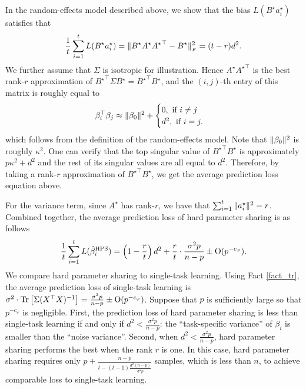 \begin{example}\label{ex_same_cov}
In the random-effects model described above, we show that the bias $L(B^{\star} a_i^{\star})$ satisfies that
\[ \frac{1}{t} \sum_{i=1}^t L(B^{\star} a_i^{\star}) = \|B^{\star} A^{\star} {A^{\star}}^{\top} - B^{\star}\|_{_{F}}^2 = (t - r) d^2. \]
We further assume that $\Sigma$ is isotropic for illustration.
Hence $A^{\star} {A^{\star}}^{\top}$ is the best rank-$r$ approximation of ${B^{\star}}^{\top}\Sigma B^{\star} = {B^{\star}}^{\top} B^{\star}$, and the $(i, j)$-th entry of this matrix is roughly equal to
\begin{align*}
	\beta_i^{\top} \beta_j \approx \|\beta_0\|^2 + \begin{cases}
																								0, \text{ if } i \neq j \\
																								d^2, \text{ if } i = j.
	\end{cases}
\end{align*}
which follows from the definition of the random-effects model.
Note that $\|\beta_0\|^2$ is roughly $\kappa^2$.
One can verify that the top singular value of ${B^{\star}}^{\top} B^{\star}$ is approximately $p \kappa^2 + d^2$ and the rest of its singular values are all equal to $d^2$.
Therefore, by taking a rank-$r$ approximation of ${B^{\star}}^{\top} B^{\star}$, we get the average prediction loss equation above.

For the variance term, since $A^{\star}$ has rank-$r$, we have that $\sum_{i=1}^t \|a_i^{\star}\|^2 = r$.
Combined together, the average prediction loss of hard parameter sharing is as follows
\[ \frac{1}{t}\sum_{i=1}^t L(\hat{\beta}_i^{\textup{HPS}}) = \left({1 - \frac{r}{t}}\right) d^2 + \frac{r}{t} \cdot \frac{\sigma^2 p}{n - p} \pm \operatorname{O}(p^{-c_{\varphi}}). \]
We compare hard parameter sharing to single-task learning.
Using Fact \ref{fact_tr}, the average prediction loss of single-task learning is $\sigma^2\cdot \operatorname{Tr}\left[\Sigma (X^{\top} X)^{-1}\right] = \frac{\sigma^2 p}{n - p} \pm \operatorname{O}(p^{-{c_{\varphi}}})$.
	Suppose that $p$ is sufficiently large so that $p^{-c_{\varphi}}$ is negligible.
First, the prediction loss of hard parameter sharing is less than single-task learning if and only if $d^2 < \frac{\sigma^2 p}{n - p}$: the ``task-specific variance'' of $\beta_i$ is smaller than the ``noise variance''.
Second, when $d^2 < \frac{\sigma^2 p}{n - p}$, hard parameter sharing performs the best when the rank $r$ is one.
	In this case, hard parameter sharing requires only $p + \frac{n - p}{t - (t - 1)\frac{d^2 (n - p)}{\sigma^2 p}}$ samples, which is less than $n$, to achieve comparable loss to single-task learning.
\end{example}



